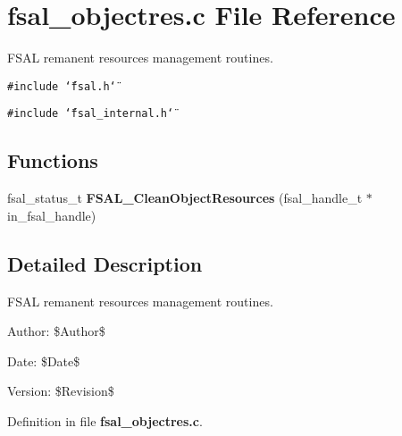 \section{fsal\_\-objectres.c File Reference}
\label{fsal__objectres_8c}
FSAL remanent resources management routines.  


{\tt \#include \char`\"{}fsal.h\char`\"{}}\par
{\tt \#include \char`\"{}fsal\_\-internal.h\char`\"{}}\par
\subsection*{Functions}
\begin{CompactItemize}
\item 
fsal\_\-status\_\-t \textbf{FSAL\_\-CleanObjectResources} (fsal\_\-handle\_\-t $\ast$in\_\-fsal\_\-handle)\label{fsal__objectres_8c_9cdb7b01b46334f98ae0c03b2bb12594}

\end{CompactItemize}


\subsection{Detailed Description}
FSAL remanent resources management routines. 

\begin{Desc}
\item[Author:]\$Author\$ \end{Desc}
\begin{Desc}
\item[Date:]\$Date\$ \end{Desc}
\begin{Desc}
\item[Version:]\$Revision\$ \end{Desc}


Definition in file {\bf fsal\_\-objectres.c}.